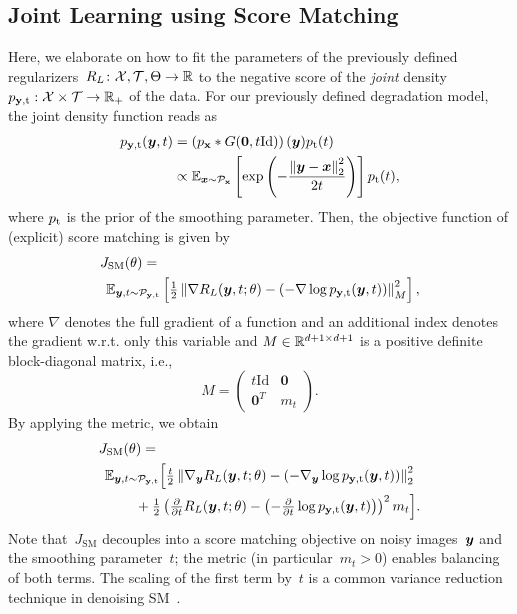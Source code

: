 \documentclass{article}
\newcommand{\X}{\mathcal{X}}
\newcommand{\T}{\mathcal{T}}
\newcommand{\id}{\mathrm{Id}}
\newcommand{\norm}[1]{\left\Vert#1\right\Vert}
\renewcommand{\vec}[1]{\mathbf{#1}}
\newcommand{\dist}[1]{\mathcal{P}_{#1}}
\newcommand{\pdf}[1]{p_{#1}}
\theoremstyle{plain}
\theoremstyle{definition}
\theoremstyle{remark}
\begin{document}
\subsection{Joint Learning using Score Matching}
Here, we elaborate on how to fit the parameters of the previously defined regularizers~$R_L\colon\X,\T,\Theta\to\R$ to the negative score of the \emph{joint} density~$\pdf{\rvy,\rt}:\X\times\T\to\R_+$ of the data.
For our previously defined degradation model, the joint density function reads as
\begin{align*}
\pdf{\rvy,\rt}(\vy,t) &= \left(\pdf{\rvx}\ast G(\vec{0},t\id)\right)(\vy) \pdf{\rt}(t)\\
&\propto \E_{\vx\sim\dist{\rvx}}\left[\exp\left(-\frac{\norm{\vy-\vx}_2^2}{2 t}\right)\right] \pdf{\rt}(t),
\end{align*}
where $\pdf{\rt}$ is the prior of the smoothing parameter.
Then, the objective function of (explicit) score matching is given by
\begin{align} \label{eq:jsm}
&J_\mathrm{SM}(\theta) = \\
&\hspace{1ex}\E_{\vy,t\sim\dist{\rvy,\rt}}\left[\tfrac12\norm{\nabla R_L(\vy,t;\theta) -\left(- \nabla\log p_{\rvy,\rt}(\vy,t)\right)}_M^2\right], \notag
\end{align}
where $\nabla$ denotes the full gradient of a function and an additional index denotes the gradient w.r.t. only this variable and 
$M\in\mathbb{R}^{d+1\times d+1}$ is a positive definite block-diagonal matrix, i.e.,
\[
M = \begin{pmatrix}
t\id & \vec{0} \\
\vec{0}^T & m_t
\end{pmatrix}.
\]
By applying the metric, we obtain
\begin{align}\label{eq:jsmParts}
&J_\mathrm{SM}(\theta)=\\
&\hspace{1ex}\E_{\vy,t\sim\dist{\rvy,\rt}}\Big[\tfrac{t}{2}\norm{\nabla_\vy R_L(\vy,t;\theta) -\left(- \nabla_\vy\log p_{\rvy,\rt}(\vy,t)\right)}_2^2 \notag\\
&\hspace{6ex}+\tfrac12\left(\tfrac{\partial}{\partial t}R_L(\vy,t;\theta) -\left(-\tfrac{\partial}{\partial t}\log p_{\rvy,\rt}(\vy,t)\right)\right)^2m_t\Big].\notag
\end{align}
Note that~$J_\mathrm{SM}$ decouples into a score matching objective on noisy images~${\bm{y}}$ and the smoothing parameter~$t$; the metric (in particular~$m_t>0$) enables balancing of both terms.
The scaling of the first term by~$t$ is a common variance reduction technique in denoising SM~\citep{SoEr19,HuLi21}.
\end{document}
